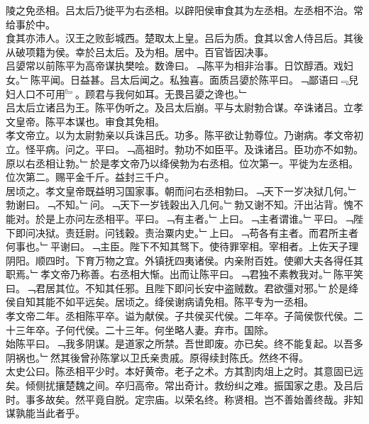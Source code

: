\documentclass{zhvt-classic}
\begin{document}
\hspace*{2em}陵之免丞相。吕太后乃徙平为右丞相。以辟阳侯审食其为左丞相。左丞相不治。常给事於中。\\
\hspace*{2em}食其亦沛人。汉王之败彭城西。楚取太上皇。吕后为质。食其以舍人侍吕后。其後从破项籍为侯。幸於吕太后。及为相。居中。百官皆因决事。\\
\hspace*{2em}吕嬃常以前陈平为高帝谋执樊哙。数谗曰。﹁陈平为相非治事。日饮醇酒。戏妇女。﹂陈平闻。日益甚。吕太后闻之。私独喜。面质吕嬃於陈平曰。﹁鄙语曰﹃兒妇人口不可用﹄。顾君与我何如耳。无畏吕嬃之谗也。﹂\\
\hspace*{2em}吕太后立诸吕为王。陈平伪听之。及吕太后崩。平与太尉勃合谋。卒诛诸吕。立孝文皇帝。陈平本谋也。审食其免相。\\
\hspace*{2em}孝文帝立。以为太尉勃亲以兵诛吕氏。功多。陈平欲让勃尊位。乃谢病。孝文帝初立。怪平病。问之。平曰。﹁高祖时。勃功不如臣平。及诛诸吕。臣功亦不如勃。原以右丞相让勃。﹂於是孝文帝乃以绛侯勃为右丞相。位次第一。平徙为左丞相。位次第二。赐平金千斤。益封三千户。\\
\hspace*{2em}居顷之。孝文皇帝既益明习国家事。朝而问右丞相勃曰。﹁天下一岁决狱几何。﹂勃谢曰。﹁不知。﹂问。﹁天下一岁钱穀出入几何。﹂勃又谢不知。汗出沾背。愧不能对。於是上亦问左丞相平。平曰。﹁有主者。﹂上曰。﹁主者谓谁。﹂平曰。﹁陛下即问决狱。责廷尉。问钱穀。责治粟内史。﹂上曰。﹁苟各有主者。而君所主者何事也。﹂平谢曰。﹁主臣。陛下不知其驽下。使待罪宰相。宰相者。上佐天子理阴阳。顺四时。下育万物之宜。外镇抚四夷诸侯。内亲附百姓。使卿大夫各得任其职焉。﹂孝文帝乃称善。右丞相大惭。出而让陈平曰。﹁君独不素教我对。﹂陈平笑曰。﹁君居其位。不知其任邪。且陛下即问长安中盗贼数。君欲彊对邪。﹂於是绛侯自知其能不如平远矣。居顷之。绛侯谢病请免相。陈平专为一丞相。\\
\hspace*{2em}孝文帝二年。丞相陈平卒。谥为献侯。子共侯买代侯。二年卒。子简侯恢代侯。二十三年卒。子何代侯。二十三年。何坐略人妻。弃市。国除。\\
\hspace*{2em}始陈平曰。﹁我多阴谋。是道家之所禁。吾世即废。亦已矣。终不能复起。以吾多阴祸也。﹂然其後曾孙陈掌以卫氏亲贵戚。原得续封陈氏。然终不得。\\
\hspace*{2em}太史公曰。陈丞相平少时。本好黄帝。老子之术。方其割肉俎上之时。其意固已远矣。倾侧扰攘楚魏之间。卒归高帝。常出奇计。救纷纠之难。振国家之患。及吕后时。事多故矣。然平竟自脱。定宗庙。以荣名终。称贤相。岂不善始善终哉。非知谋孰能当此者乎。\\
\end{document}
